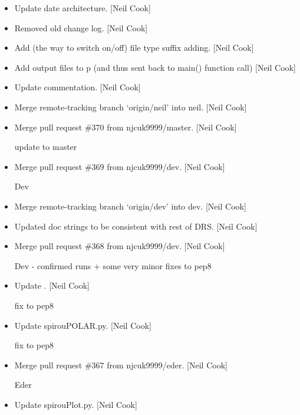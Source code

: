 \documentclass[a4paper,10pt,english]{report}
\begin{document}
\begin{itemize}
\item {} 
Update date architecture. {[}Neil Cook{]}

\item {} 
Removed old change log. {[}Neil Cook{]}

\item {} 
Add  (the way to switch on/off) file type suffix adding. {[}Neil
Cook{]}

\item {} 
Add output files to p (and thus sent back to main() function call)
{[}Neil Cook{]}

\item {} 
Update commentation. {[}Neil Cook{]}

\item {} 
Merge remote-tracking branch ‘origin/neil’ into neil. {[}Neil Cook{]}

\item {} 
Merge pull request \#370 from njcuk9999/master. {[}Neil Cook{]}

update to master

\item {} 
Merge pull request \#369 from njcuk9999/dev. {[}Neil Cook{]}

Dev

\item {} 
Merge remote-tracking branch ‘origin/dev’ into dev. {[}Neil Cook{]}

\item {} 
Updated doc strings to be consistent with rest of DRS. {[}Neil Cook{]}

\item {} 
Merge pull request \#368 from njcuk9999/dev. {[}Neil Cook{]}

Dev - confirmed runs + some very minor fixes to pep8

\item {} 
Update . {[}Neil Cook{]}

fix to pep8

\item {} 
Update spirouPOLAR.py. {[}Neil Cook{]}

fix to pep8

\item {} 
Merge pull request \#367 from njcuk9999/eder. {[}Neil Cook{]}

Eder

\item {} 
Update spirouPlot.py. {[}Neil Cook{]}


\end{itemize}
\end{document}
